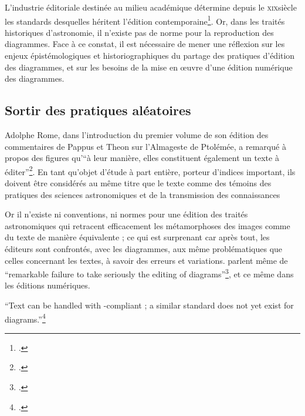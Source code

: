 L'industrie éditoriale destinée au milieu académique détermine depuis le
\textsc{xix}\ieme siècle les standards desquelles héritent l'édition
contemporaine\footcite{epron_ledition_2018}. Or, dans les traités historiques
d'astronomie, il n'existe pas de norme pour la reproduction des
diagrammes. Face à ce constat, il est nécessaire de mener une réflexion
sur les enjeux épistémologiques et historiographiques du partage des pratiques d'édition des diagrammes, et sur les besoins de la
mise en œuvre d'une édition numérique des diagrammes.

\hypertarget{sortir-des-pratiques-aleatoires}{%
\subsection{Sortir des pratiques
aléatoires}\label{sortir-des-pratiques-aleatoires}}

Adolphe Rome, dans l'introduction du premier volume de son édition des
commentaires de Pappus et Theon sur l'Almageste de Ptolémée, a remarqué
à propos des figures qu'``à leur manière, elles constituent également un
texte à éditer''\footcite[Commentaires de Pappus et de Théon d'Alexandre sur
l'Almageste, ed.~by A. Rome (Rome, 1931), i, p.~xxiv.][p.394]{jardine_critical_2010}. En
tant qu'objet d'étude à part entière, porteur d'indices important, ils
doivent être considérés au même titre que le texte comme des témoins des
pratiques des sciences astronomiques et de la transmission des
connaissances

Or il n'existe ni conventions, ni normes pour une édition des traités
astronomiques qui retracent efficacement les métamorphoses des images
comme du texte de manière équivalente ; ce qui est surprenant car après
tout, les éditeurs sont confrontés, avec les diagrammes, aux même
problématiques que celles concernant les textes, à savoir des erreurs et
variations. \citeauthor{jardine_critical_2010} parlent même de \enquote{remarkable failure to take seriously
the editing of diagrams}\footcite[p.393]{jardine_critical_2010}, et ce même dans les éditions
numériques.

\begin{kwote}
``Text can be handled with \tei-compliant \xml ; a similar standard does not
yet exist for diagrams.''\footcite[p.77]{roughan_digital_2014}
\end{kwote}


